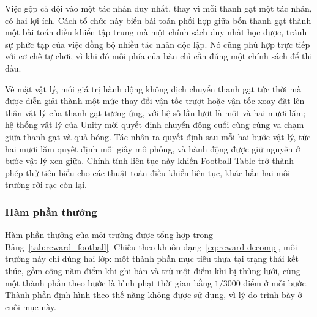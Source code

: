 \indent Việc gộp cả đội vào một tác nhân duy nhất, thay vì mỗi thanh gạt một tác nhân,
có hai lợi ích. Cách tổ chức này biến bài toán phối hợp giữa bốn thanh gạt thành một
bài toán điều khiển tập trung mà một chính sách duy nhất học được, tránh sự phức tạp
của việc đồng bộ nhiều tác nhân độc lập. Nó cũng phù hợp trực tiếp với cơ chế tự chơi,
vì khi đó mỗi phía của bàn chỉ cần đúng một chính sách để thi đấu.

\indent Về mặt vật lý, mỗi giá trị hành động không dịch chuyển thanh gạt tức thời mà
được diễn giải thành một mức thay đổi vận tốc trượt hoặc vận tốc xoay đặt lên thân vật
lý của thanh gạt tương ứng, với hệ số lần lượt là một và hai mươi lăm; hệ thống vật lý
của Unity mới quyết định chuyển động cuối cùng cùng va chạm giữa thanh gạt và quả bóng.
Tác nhân ra quyết định sau mỗi hai bước vật lý, tức hai mươi lăm quyết định mỗi giây mô
phỏng, và hành động được giữ nguyên ở bước vật lý xen giữa. Chính tính liên tục này
khiến Football Table trở thành phép thử tiêu biểu cho các thuật toán điều khiển liên
tục, khác hẳn hai môi trường rời rạc còn lại.

\subsubsection{Hàm phần thưởng}
\indent Hàm phần thưởng của môi trường được tổng hợp trong
Bảng~\ref{tab:reward_football}. Chiếu theo khuôn dạng~\eqref{eq:reward-decomp}, môi
trường này chỉ dùng hai lớp: một thành phần mục tiêu thưa tại trạng thái kết thúc,
gồm cộng năm điểm khi ghi bàn và trừ một điểm khi bị thủng lưới, cùng một thành phần
theo bước là hình phạt thời gian bằng $1/3000$ điểm ở mỗi bước. Thành phần định hình
theo thế năng không được sử dụng, vì lý do trình bày ở cuối mục này.

